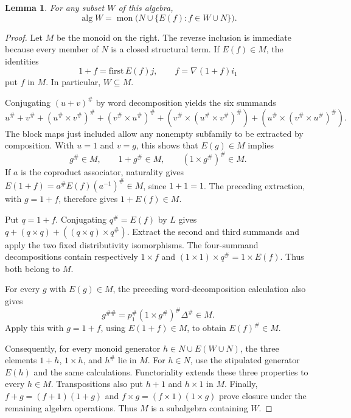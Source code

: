 \documentclass[11pt]{article}
\newtheorem{lemma}[theorem]{Lemma}
\begin{document}
\begin{lemma}\label{lem:finitegeneration}
For any subset $W$ of this algebra,
\[
\operatorname{alg}W
=\operatorname{mon}\bigl(N\cup\{E(f):f\in W\cup N\}\bigr).
\]
\end{lemma}
\begin{proof}
Let $M$ be the monoid on the right. The reverse inclusion is immediate because every member of $N$ is a closed structural term. If $E(f)\in M$, the identities
\[
1+f=\mathrm{first}\,E(f)j,\qquad
f=\nabla(1+f)i_1
\]
put $f$ in $M$. In particular, $W\subseteq M$.

Conjugating $(u+v)^\#$ by word decomposition yields the six summands
\[
u^\#+v^\#+(u^\#\times v^\#)^\#+(v^\#\times u^\#)^\#
 +(v^\#\times(u^\#\times v^\#)^\#)
 +(u^\#\times(v^\#\times u^\#)^\#).
\]
The block maps just included allow any nonempty subfamily to be extracted by composition. With $u=1$ and $v=g$, this shows that $E(g)\in M$ implies
\[
g^\#\in M,\qquad 1+g^\#\in M,\qquad
(1\times g^\#)^\#\in M.
\]
If $a$ is the coproduct associator, naturality gives
$E(1+f)=a^\#E(f)(a^{-1})^\#\in M$, since $1+1=1$.
The preceding extraction, with $g=1+f$, therefore gives $1+E(f)\in M$.

Put $q=1+f$. Conjugating $q^\#=E(f)$ by $L$ gives
$q+(q\times q)+((q\times q)\times q^\#)$.
Extract the second and third summands and apply the two fixed distributivity isomorphisms. The four-summand decompositions contain respectively $1\times f$ and $(1\times1)\times q^\#=1\times E(f)$. Thus both belong to $M$.

For every $g$ with $E(g)\in M$, the preceding word-decomposition calculation also gives
\[
g^{\#\#}=p_1^\#(1\times g^\#)^\#\Delta^\#\in M.
\]
Apply this with $g=1+f$, using $E(1+f)\in M$, to obtain $E(f)^\#\in M$.

Consequently, for every monoid generator $h\in N\cup E(W\cup N)$, the three elements $1+h$, $1\times h$, and $h^\#$ lie in $M$. For $h\in N$, use the stipulated generator $E(h)$ and the same calculations. Functoriality extends these three properties to every $h\in M$. Transpositions also put $h+1$ and $h\times1$ in $M$. Finally,
$f+g=(f+1)(1+g)$ and $f\times g=(f\times1)(1\times g)$
prove closure under the remaining algebra operations. Thus $M$ is a subalgebra containing $W$.
\end{proof}
\end{document}

